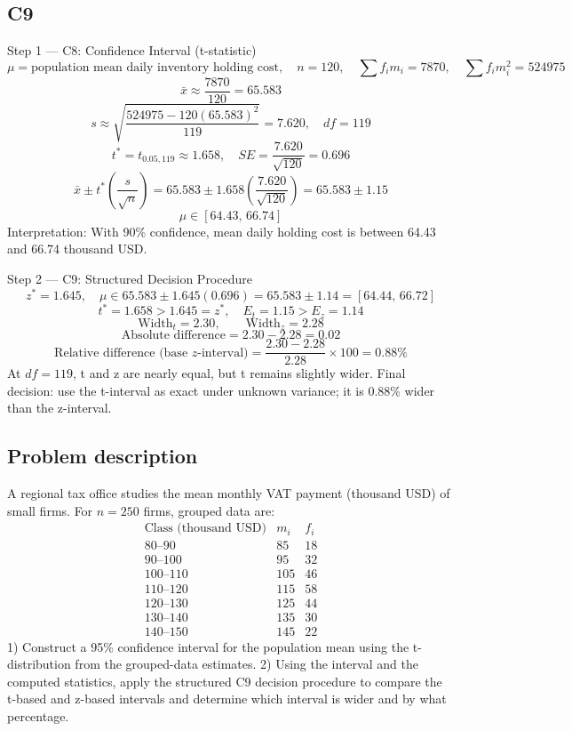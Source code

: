 \begin{ExamProblems}
		\subsection*{C9}
		Step 1 --- C8: Confidence Interval (t-statistic)
		\[
		\mu=\text{population mean daily inventory holding cost},\quad n=120,\quad \sum f_im_i=7870,\quad \sum f_im_i^2=524975
		\]
		\[
		\bar{x}\approx\frac{7870}{120}=65.583
		\]
		\[
		s\approx\sqrt{\frac{524975-120(65.583)^2}{119}}=7.620,\quad df=119
		\]
		\[
		t^*=t_{0.05,119}\approx 1.658,\quad SE=\frac{7.620}{\sqrt{120}}=0.696
		\]
		\[
		\bar{x}\pm t^*\left(\frac{s}{\sqrt{n}}\right)=65.583\pm 1.658\left(\frac{7.620}{\sqrt{120}}\right)=65.583\pm 1.15
		\]
		\[
		\mu\in[64.43,\,66.74]
		\]
		Interpretation: With 90\% confidence, mean daily holding cost is between 64.43 and 66.74 thousand USD.

		Step 2 --- C9: Structured Decision Procedure
		\[
		z^*=1.645,\quad \mu\in 65.583\pm 1.645(0.696)=65.583\pm 1.14=[64.44,\,66.72]
		\]
		\[
		t^*=1.658>1.645=z^*,\quad E_t=1.15>E_z=1.14
		\]
		\[
		\text{Width}_t=2.30,\qquad \text{Width}_z=2.28
		\]
		\[
		\text{Absolute difference}=2.30-2.28=0.02
		\]
		\[
		\text{Relative difference (base }z\text{-interval)}=\frac{2.30-2.28}{2.28}\times 100=0.88\%
		\]
		At $df=119$, t and z are nearly equal, but t remains slightly wider.
		Final decision: use the t-interval as exact under unknown variance; it is 0.88\% wider than the z-interval.

		\newpage
		\item
		\subsection*{Problem description}
		A regional tax office studies the mean monthly VAT payment (thousand USD) of small firms.
		For $n=250$ firms, grouped data are:
		\[
		\begin{array}{c|c|c}
		\text{Class (thousand USD)} & m_i & f_i\\\hline
		80\text{--}90 & 85 & 18\\
		90\text{--}100 & 95 & 32\\
		100\text{--}110 & 105 & 46\\
		110\text{--}120 & 115 & 58\\
		120\text{--}130 & 125 & 44\\
		130\text{--}140 & 135 & 30\\
		140\text{--}150 & 145 & 22
		\end{array}
		\]
		1) Construct a 95\% confidence interval for the population mean using the t-distribution from the grouped-data estimates.
		2) Using the interval and the computed statistics, apply the structured C9 decision procedure to compare the t-based and z-based intervals and determine which interval is wider and by what percentage.


\end{ExamProblems}
